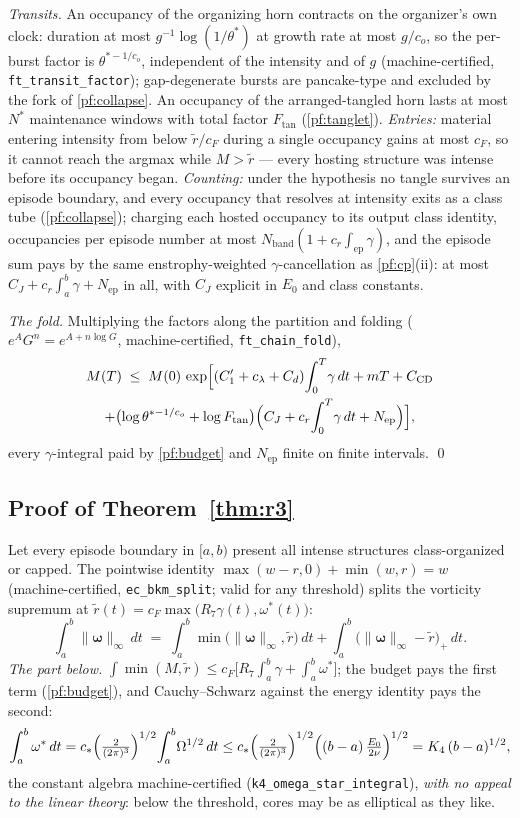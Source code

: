 \documentclass[11pt,letterpaper]{amsart}
\theoremstyle{definition}
\theoremstyle{remark}
\newcommand{\om}{\omega}
\newcommand{\vort}{\boldsymbol{\omega}}
\newcommand{\norm}[1]{\lVert #1 \rVert}
\begin{document}
\emph{Transits.} An occupancy of the organizing horn contracts on the organizer's
own clock: duration at most $g^{-1}\log(1/\theta^*)$ at growth rate at most
$g/c_o$, so the per-burst factor is $\theta^{*-1/c_o}$, independent of the
intensity and of $g$ (machine-certified, \texttt{ft\_transit\_factor});
gap-degenerate bursts are pancake-type and excluded by the fork of
\cref{pf:collapse}. An occupancy of the arranged-tangled horn lasts at most $N^*$
maintenance windows with total factor $F_{\mathrm{tan}}$ (\cref{pf:tanglet}).
\emph{Entries:} material entering intensity from below $\tilde r/c_F$ during a
single occupancy gains at most $c_F$, so it cannot reach the argmax while
$M>\tilde r$ --- every hosting structure was intense before its occupancy began.
\emph{Counting:} under the hypothesis no tangle survives an episode boundary, and
every occupancy that resolves at intensity exits as a class tube
(\cref{pf:collapse}); charging each hosted occupancy to its output class identity,
occupancies per episode number at most
$N_{\mathrm{band}}(1+c_r\int_{\mathrm{ep}}\gamma)$, and the episode sum pays by the
same enstrophy-weighted $\gamma$-cancellation as \cref{pf:cp}(ii): at most
$C_J+c_r\int_a^b\gamma+N_{\mathrm{ep}}$ in all, with $C_J$ explicit in $E_0$ and
class constants.

\emph{The fold.} Multiplying the factors along the partition and folding
($e^AG^n=e^{A+n\log G}$, machine-certified, \texttt{ft\_chain\_fold}),
\begin{multline*}
M(T)\;\le\;M(0)\,
\exp\Bigl[(C_1'+c_\lambda+C_d)\!\int_0^T\!\gamma\,dt+mT+C_{\mathrm{CD}}\\
+\bigl(\log\theta^{*-1/c_o}+\log F_{\mathrm{tan}}\bigr)
\Bigl(C_J+c_r\!\int_0^T\!\gamma\,dt+N_{\mathrm{ep}}\Bigr)\Bigr],
\end{multline*}
every $\gamma$-integral paid by \cref{pf:budget} and $N_{\mathrm{ep}}$ finite on
finite intervals. \qed

\subsection{Proof of Theorem~\ref{thm:r3}}\label{pf:r3}
Let every episode boundary in $[a,b)$ present all intense structures class-organized
or capped. The pointwise identity $\max(w-r,0)+\min(w,r)=w$ (machine-certified,
\texttt{ec\_bkm\_split}; valid for any threshold) splits the vorticity supremum at
$\tilde r(t)=c_F\max\bigl(R_7\gamma(t),\om^*(t)\bigr)$:
\[
\int_a^b\norm{\vort}_\infty\,dt
\;=\;\int_a^b\min\bigl(\norm{\vort}_\infty,\tilde r\bigr)\,dt
+\int_a^b\bigl(\norm{\vort}_\infty-\tilde r\bigr)_+\,dt .
\]
\emph{The part below.}
$\int\min(M,\tilde r)\le c_F\bigl[R_7\int_a^b\gamma+\int_a^b\om^*\bigr]$; the
budget pays the first term (\cref{pf:budget}), and Cauchy--Schwarz against the
energy identity pays the second:
\[
\int_a^b\om^*\,dt
= c_*\Bigl(\tfrac{2}{(2\pi)^3}\Bigr)^{1/2}\!\int_a^b\!\Omega^{1/2}\,dt
\le c_*\Bigl(\tfrac{2}{(2\pi)^3}\Bigr)^{1/2}\Bigl((b-a)\,\tfrac{E_0}{2\nu}\Bigr)^{1/2}
= K_4\,(b-a)^{1/2},
\]
the constant algebra machine-certified (\texttt{k4\_omega\_star\_integral}),
\emph{with no appeal to the linear theory}: below the threshold, cores may be as
elliptical as they like.
\end{document}
